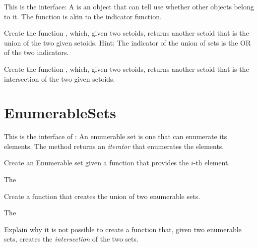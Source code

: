 This is the \Setoid interface:
%
%
A \Setoid is an object that can tell use whether other objects belong to it.
The  function is akin to the indicator function.


\begin{exercise}
  Create the function , which, given two setoids, returns another setoid that is the union of the two given setoids.
%
%
  Hint: The indicator of the union of sets is the OR of the two indicators.
\end{exercise}

\begin{exercise}
  Create the function , which, given two setoids, returns another setoid that is the intersection of the two given setoids.
%
\end{exercise}


\section{EnumerableSets}

This is the interface of :
%
%
An enumerable set is one that can enumerate its elements.
The method  returns an \emph{iterator} that enumerates the elements.

\begin{exercise}
  Create an Enumerable set given a function that provides the $i$-th element.

  The
%
\end{exercise}

\begin{exercise}
  Create a function that creates the union of two enumerable sets.

  The
%
\end{exercise}

\begin{exercise}
  Explain why it is not possible to create a function that, given two enumerable sets,
  creates the \emph{intersection} of the two sets.
\end{exercise}


